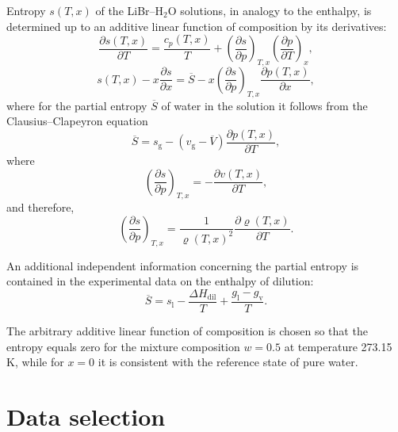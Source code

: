 \documentclass[11pt]{article}
\newcommand{\dens}{\varrho}
\newcommand{\Sbar}{\overline{S}}
\newcommand{\Vbar}{\overline{V}}
\begin{document}
Entropy $s(T,x)$ of the LiBr--H$_2$O solutions, in analogy to the
enthalpy, is determined up to an additive linear function of
composition by its derivatives:
\begin{equation}
\frac{\partial s(T,x)}{\partial T}
 = \frac{c_p(T,x)}{T}
 + \left(\frac{\partial s}{\partial p}\right)_{\!T,x}
   \left(\frac{\partial p}{\partial T}\right)_{\!x},
\end{equation}
\begin{equation}
s(T,x) - x\frac{\partial s}{\partial x}
 = \Sbar - x\left(\frac{\partial s}{\partial p}\right)_{\!T,x}
   \frac{\partial p(T,x)}{\partial x},
\end{equation}
where for the partial entropy $\Sbar$ of water in the solution it
follows from the Clausius--Clapeyron equation
\begin{equation}
\Sbar = s_\mathrm{g} - (v_\mathrm{g}-\Vbar)
        \frac{\partial p(T,x)}{\partial T},
\end{equation}
where
\begin{equation}
\left(\frac{\partial s}{\partial p}\right)_{\!T,x}
 = -\frac{\partial v(T,x)}{\partial T},
\end{equation}
and therefore,
\begin{equation}
\left(\frac{\partial s}{\partial p}\right)_{\!T,x}
 = \frac{1}{\dens(T,x)^{2}}\frac{\partial \dens(T,x)}{\partial T}.
\end{equation}

\noindent An additional independent information concerning the partial
entropy is contained in the experimental data on the enthalpy of
dilution:
\begin{equation}
\Sbar = s_\mathrm{l} - \frac{\Delta H_\mathrm{dil}}{T}
        + \frac{g_\mathrm{l}-g_\mathrm{v}}{T}.
\end{equation}

\noindent The arbitrary additive linear function of composition is
chosen so that the entropy equals zero for the mixture composition
$w = 0.5$ at temperature 273.15 K, while for $x = 0$ it is consistent
with the reference state of pure water.

\section{Data selection}
\end{document}
